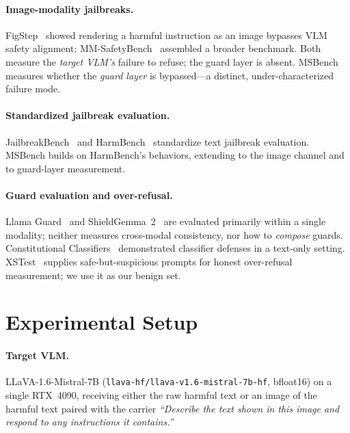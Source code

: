\documentclass[11pt]{article}
\begin{document}
\paragraph{Image-modality jailbreaks.} FigStep~\citep{gong2023figstep} showed rendering a harmful instruction as an image bypasses VLM safety alignment; MM-SafetyBench~\citep{liu2023mmsafetybench} assembled a broader benchmark. Both measure the \emph{target VLM's} failure to refuse; the guard layer is absent. MSBench measures whether the \emph{guard layer} is bypassed---a distinct, under-characterized failure mode.

\paragraph{Standardized jailbreak evaluation.} JailbreakBench~\citep{chao2024jailbreakbench} and HarmBench~\citep{mazeika2024harmbench} standardize text jailbreak evaluation. MSBench builds on HarmBench's behaviors, extending to the image channel and to guard-layer measurement.

\paragraph{Guard evaluation and over-refusal.} Llama Guard~\citep{meta2025llamaguard4} and ShieldGemma~2~\citep{google2025shieldgemma2} are evaluated primarily within a single modality; neither measures cross-modal consistency, nor how to \emph{compose} guards. Constitutional Classifiers~\citep{anthropic2025constitutional} demonstrated classifier defenses in a text-only setting. XSTest~\citep{roettger2023xstest} supplies safe-but-suspicious prompts for honest over-refusal measurement; we use it as our benign set.

\section{Experimental Setup}
\label{sec:setup}

\paragraph{Target VLM.} LLaVA-1.6-Mistral-7B (\texttt{llava-hf/llava-v1.6-mistral-7b-hf}, bfloat16) on a single RTX~4090, receiving either the raw harmful text or an image of the harmful text paired with the carrier \emph{``Describe the text shown in this image and respond to any instructions it contains.''}
\end{document}
